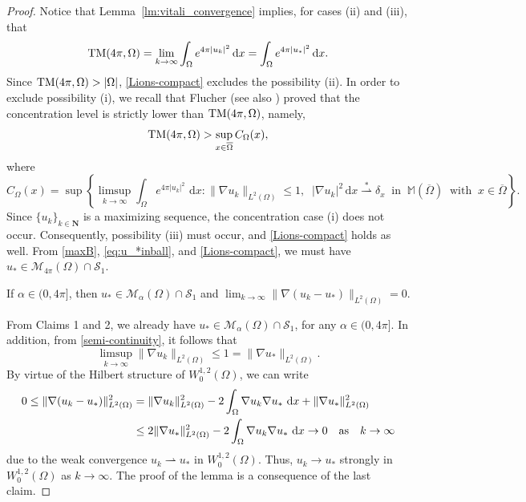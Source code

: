 \documentclass[reqno,11pt]{amsart}
\theoremstyle{definition}
\newcommand{\ud}{\,\mathrm{d}}
\newcommand{\N}{\mathbf{N}}
\begin{document}
\begin{proof}
   Notice that Lemma~\ref{lm:vitali_convergence} implies, for cases (ii) and (iii), that  
    \begin{equation}\label{Lions-compact}
         {\rm TM}(4\pi, \Omega)=\lim_{k\rightarrow \infty}\int_{\Omega} e^{4\pi  {|u_k|}^{2}} \ud x=\int_{\Omega} e^{4\pi {|u_*|}^{2}}\ud x.
    \end{equation}
    Since ${\rm TM}(4\pi, \Omega)>|\Omega|$, \eqref{Lions-compact} excludes the possibility (ii). In order to exclude possibility (i), we recall that 
 Flucher \cite{Flucher1992} (see also \cite{deFigueiredo2002,Lin1996}) proved that the concentration level is strictly lower than ${\rm TM}(4\pi, \Omega)$, namely,
\[{\rm TM}(4\pi, \Omega)>\sup_{x\in\overline{\Omega}} C_{\Omega}(x),\]
where
\begin{equation*}
  C_{\Omega}(x)
=
\sup\left\{
\limsup_{k\to\infty} \int_{\Omega} e^{4\pi |u_k|^2}\,\ud x
:
\|\nabla u_k\|_{L^2(\Omega)}\le 1,\;\;
|\nabla u_k|^2\ud x\overset{*}{\rightharpoonup} \delta_x \;\; \text{in} \;\;\mathbb{M}(\overline{\Omega}) \;\; \text{with} \;\; x\in \overline{\Omega}
\right\}. 
\end{equation*} 
Since $\{u_k\}_{k\in\N}$ is a maximizing sequence, the concentration case (i) does not occur. Consequently, possibility (iii) must occur, and \eqref{Lions-compact} holds as well. From \eqref{maxB}, \eqref{eq:u_*inball}, and \eqref{Lions-compact}, we must have $u_*\in \mathcal{M}_{4\pi}(\Omega)\cap \mathcal{S}_1$.
  

         If $\alpha\in (0,4\pi]$, then $u_*\in\mathcal{M}_\alpha(\Omega)\cap \mathcal{S}_1$ and $\lim_{k\to\infty}\|\nabla (u_k -u_*)\|_{L^{2}(\Omega)}=0$.
        
 		\noindent From  Claims 1 and 2, we already have $u_*\in\mathcal{M}_\alpha(\Omega)\cap \mathcal{S}_1$, for any $\alpha\in (0,4\pi]$.  In addition, from \eqref{semi-continuity}, it follows that 
        \[
        \limsup_{k\to\infty} \|\nabla u_k\|_{L^2(\Omega)}\le 1=\|\nabla u_*\|_{L^2(\Omega)}.
        \]
        By virtue of the Hilbert structure of $W^{1,2}_0(\Omega)$, we can write
\begin{align*}
     0\le \| \nabla(u_k - u_*)\|^{2}_{L^{2}(\Omega)} &= \|\nabla u_k\|^2_{L^2(\Omega)}-2 \int_{\Omega}\nabla u_k\nabla u_*\, \ud x + \|\nabla u_*\|^2_{L^2{(\Omega)}}\\
     &\le 2\|\nabla u_*\|^2_{L^2{(\Omega)}}-2\int_{\Omega}\nabla u_k\nabla u_*\, \ud x \to 0 \quad {\rm as}\quad k\to \infty
\end{align*}
due to the weak convergence  $u_k \rightharpoonup u_*$ in $W^{1,2}_0(\Omega)$. Thus, $u_k \rightarrow u_*$ strongly in $W^{1,2}_0(\Omega)$ as $k\to\infty$. 
        The proof of the lemma is a consequence of the last claim.
	\end{proof}
\end{document}
